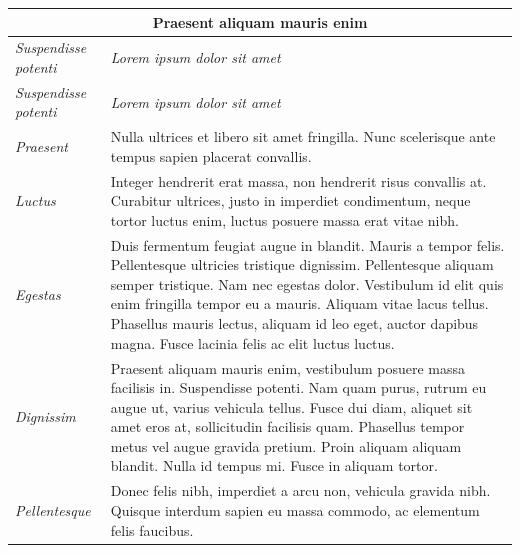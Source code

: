 	\begin{center}
		\begin{longtable}{ | p{} | p{} | }
			
			\hline
			\multicolumn{2}{|c|}{\textbf{Praesent aliquam mauris enim}}
			\\ \hline
			
			\emph{Suspendisse potenti} & \emph{Lorem ipsum dolor sit amet}
			\\ \hline \hline
			\endfirsthead %
			
			\hline
			\emph{Suspendisse potenti} & \emph{Lorem ipsum dolor sit amet}
			\\ \hline \hline
			\endhead %
			
			\hline
			\endfoot %
			
			\endlastfoot %
			
			\emph{Praesent}
			& Nulla ultrices et libero sit amet fringilla. Nunc scelerisque ante tempus sapien placerat convallis.
			\\ \hline
			
			\emph{Luctus}
			& Integer hendrerit erat massa, non hendrerit risus convallis at. Curabitur ultrices, justo in imperdiet condimentum, neque tortor luctus enim, luctus posuere massa erat vitae nibh.
			\\ \hline
			
			\emph{Egestas}
			& Duis fermentum feugiat augue in blandit. Mauris a tempor felis. Pellentesque ultricies tristique dignissim. Pellentesque aliquam semper tristique. Nam nec egestas dolor. Vestibulum id elit quis enim fringilla tempor eu a mauris. Aliquam vitae lacus tellus. Phasellus mauris lectus, aliquam id leo eget, auctor dapibus magna. Fusce lacinia felis ac elit luctus luctus.
			\\ \hline
			
			\emph{Dignissim}
			& Praesent aliquam mauris enim, vestibulum posuere massa facilisis in. Suspendisse potenti. Nam quam purus, rutrum eu augue ut, varius vehicula tellus. Fusce dui diam, aliquet sit amet eros at, sollicitudin facilisis quam. Phasellus tempor metus vel augue gravida pretium. Proin aliquam aliquam blandit. Nulla id tempus mi. Fusce in aliquam tortor.
			\\ \hline
			
			\emph{Pellentesque}
			& Donec felis nibh, imperdiet a arcu non, vehicula gravida nibh. Quisque interdum sapien eu massa commodo, ac elementum felis faucibus.
			\\ \hline
			

\end{longtable}
\end{center}
